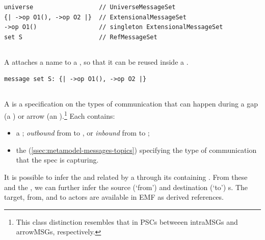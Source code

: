 \begin{lstlisting}[style=Example]
universe                  // UniverseMessageSet
{| ->op O1(), ->op O2 |}  // ExtensionalMessageSet
->op O1()                 // singleton ExtensionalMessageSet
set S                     // RefMessageSet
\end{lstlisting}

\subsection{\mnamedmessageset}\label{ssec:metamodel-messages-named-sets}

A \mnamedmessageset{} attaches a name to a \mmessageset, so that it can be reused
inside a \msequence.

\begin{lstlisting}[style=Example]
message set S: {| ->op O1(), ->op O2 |}
\end{lstlisting}

\subsection{\mmessagespec}

A \mmessagespec{} is a specification on the types of communication that can
happen during a gap (a \mgapmessagespec) or arrow (an \marrowmessagespec).\footnote{
This class distinction resembles that in PSCs betweeen intraMSGs and arrowMSGs,
respectively.}  Each \mmessagespec{} contains:

\begin{itemize}
\item
  a \mmessagedirection; \emph{outbound} from \mtarget{} to \mworld,
  or \emph{inbound} from \mworld{} to \mtarget;
\item
  the \mmessagetopic{} (\cref{ssec:metamodel-messages-topics}) specifying
  the type of communication that the spec is capturing.
\end{itemize}

It is possible to infer the \mtarget{} and \mworld{} related by a
\mmessagespec{} through its containing \msequencegroup.  From these
and the \mmessagedirection, we can further infer the source (`from')
and destination (`to') \mactor s.  The target, from, and to actors are
available in EMF as derived references.

